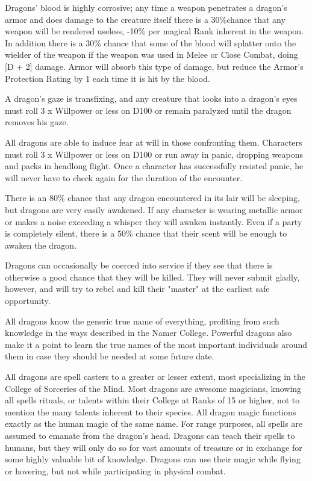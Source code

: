 \begin{multicols}{2}
Dragons' blood is highly corrosive; any time a weapon penetrates a
dragon's armor and does damage to the creature itself there is a 30\%chance that any weapon will be rendered useless, -10\% per magical Rank
inherent in the weapon.  In addition there is a 30\% chance that some
of the blood will splatter onto the wielder of the weapon if the
weapon was used in Melee or Close Combat, doing [D + 2] damage.  Armor
will absorb this type of damage, but reduce the Armor's Protection
Rating by 1 each time it is hit by the blood.

A dragon's gaze is transfixing, and any creature that looks into a
dragon's eyes must roll 3 x Willpower or less on D100 or remain
paralyzed until the dragon removes his gaze.

All dragons are able to induce fear at will in those confronting
them. Characters must roll 3 x Willpower or less on D100 or run away
in panic, dropping weapons and packs in headlong flight.  Once a
character has successfully resisted panic, he will never have to check
again for the duration of the encounter.

There is an 80\% chance that any dragon encountered in its lair will be
sleeping, but dragons are very easily awakened.  If any character is
wearing metallic armor or makes a noise exceeding a whisper they will
awaken instantly.  Even if a party is completely silent, there is a
50\% chance that their scent will be enough to awaken the dragon.

Dragons can occasionally be coerced into service if they see that
there is otherwise a good chance that they will be killed.  They will
never submit gladly, however, and will try to rebel and kill their
"master" at the earliest safe opportunity.

All dragons know the generic true name of everything, profiting from
such knowledge in the ways described in the Namer College. Powerful
dragons also make it a point to learn the true names of the most
important individuals around them in case they should be needed at
some future date.

All dragons are spell casters to a greater or lesser extent, most
specializing in the College of Sorceries of the Mind.  Most dragons
are awesome magicians, knowing all spells rituals, or talents within
their College at Ranks of 15 or higher, not to mention the many
talents inherent to their species.  All dragon magic functions exactly
as the human magic of the same name.  For range purposes, all spells
are assumed to emanate from the dragon's head.  Dragons can teach
their spells to humans, but they will only do so for vast amounts of
treasure or in exchange for some highly valuable bit of knowledge.
Dragons can use their magic while flying or hovering, but not while
participating in physical combat.


\end{multicols}
